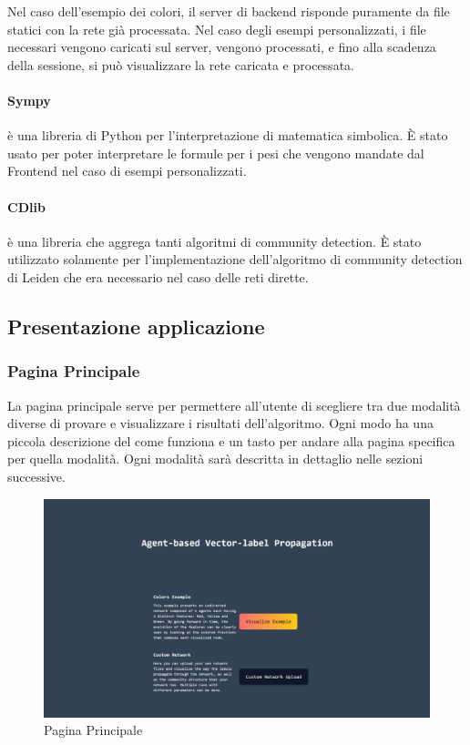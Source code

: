 \documentclass[a4paper,12pt]{report}
\begin{document}
				Nel caso dell'esempio dei colori, il server di backend risponde puramente da file statici con la rete già processata. Nel caso degli esempi personalizzati, i file necessari vengono caricati sul server, vengono processati, e fino alla scadenza della sessione, si può visualizzare la rete caricata e processata.

			\paragraph*{Sympy} è una libreria di Python per l'interpretazione di matematica simbolica. È stato usato per poter interpretare le formule per i pesi che vengono mandate dal Frontend nel caso di esempi personalizzati. \cite{sympy}

			\paragraph*{CDlib} è una libreria che aggrega tanti algoritmi di community detection. È stato utilizzato solamente per l'implementazione dell'algoritmo di community detection di Leiden che era necessario nel caso delle reti dirette. \cite{cdlib}
			
		\subsection{Presentazione applicazione}
			
			\subsubsection{Pagina Principale}
			La pagina principale serve per permettere all'utente di scegliere tra due modalità diverse di provare e visualizzare i risultati dell'algoritmo. Ogni modo ha una piccola descrizione del come funziona e un tasto per andare alla pagina specifica per quella modalità. Ogni modalità sarà descritta in dettaglio nelle sezioni 	successive.

			\begin{center}
			\begin{figure}[H]
			\centering
			\includegraphics[width=0.9\linewidth,keepaspectratio]{paginaprincipale}
			\caption{Pagina Principale}
			\end{figure}
			\end{center}
\end{document}
